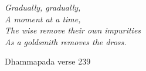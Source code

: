 \cleartorecto
\thispagestyle{empty}

\mbox{}\vfill

\hspace*{5mm}%
\begin{minipage}{\linewidth - 10mm}%
\setlength{\parskip}{5pt}%
\fontsize{10.5}{14.5}\selectfont
\raggedright
\itshape
Gradually, gradually,\\
A moment at a time,\\
The wise remove their own impurities\\
As a goldsmith removes the dross.

\vspace*{\baselineskip}

Dhammapada verse 239
\end{minipage}

\vfill\mbox{}